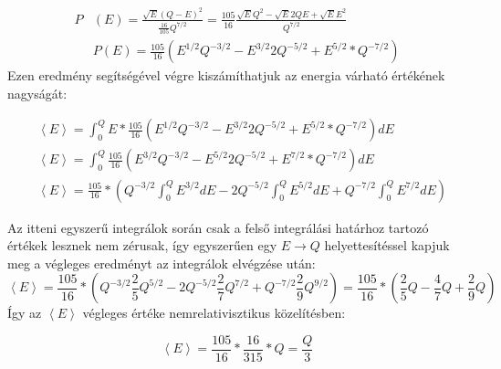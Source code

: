 \begin{align} \label{eq:31}
P& \left( E \right)
=
\frac{\sqrt{E} \left( Q - E \right)^{2}}{\frac{16}{105} Q^{7/2}}
=
\frac{105}{16} \frac{\sqrt{E} Q^{2} - \sqrt{E} 2QE + \sqrt{E} E^{2}}{Q^{7/2}}
\nonumber \\
&P \left( E \right)
=
\frac{105}{16} \left( E^{1/2} Q^{-3/2} - E^{3/2} 2 Q^{-5/2} + E^{5/2} * Q^{-7/2} \right)
\end{align}
Ezen eredmény segítségével végre kiszámíthatjuk az energia várható értékének nagyságát:

\begin{align} \label{eq:32}
&\left< E \right>
=
\int_{0}^{Q} E * \frac{105}{16} \left( E^{1/2} Q^{-3/2} - E^{3/2} 2 Q^{-5/2} + E^{5/2} * Q^{-7/2} \right) dE
\nonumber \\
&\left< E \right>
=
\int_{0}^{Q} \frac{105}{16} \left( E^{3/2} Q^{-3/2} - E^{5/2} 2 Q^{-5/2} + E^{7/2} * Q^{-7/2} \right) dE
\nonumber \\
&\left< E \right>
=
\frac{105}{16}
*
\left(
Q^{-3/2} \int_{0}^{Q} E^{3/2} dE
-
2 Q^{-5/2} \int_{0}^{Q} E^{5/2} dE
+
Q^{-7/2} \int_{0}^{Q} E^{7/2} dE
\right)
\end{align}

Az itteni egyszerű integrálok során csak a felső integrálási határhoz tartozó értékek lesznek nem zérusak, így egyszerűen egy $E \to Q$ helyettesítéssel kapjuk meg a végleges eredményt az integrálok elvégzése után:
\begin{equation} \label{eq:33}
\left< E \right>
=
\frac{105}{16}
*
\left(
Q^{-3/2} \frac{2}{5} Q^{5/2} - 2Q^{-5/2} \frac{2}{7} Q^{7/2} + Q^{-7/2} \frac{2}{9} Q^{9/2}
\right)
=
\frac{105}{16}
*
\left(
\frac{2}{5} Q - \frac{4}{7} Q + \frac{2}{9} Q
\right)
\end{equation}
Így az $\left< E \right>$ végleges értéke nemrelativisztikus közelítésben:

\begin{equation} \label{eq:34}
\left< E \right>
=
\frac{105}{16}
*
\frac{16}{315}
*
Q
=
\frac{Q}{3}
\end{equation}

\newpage
